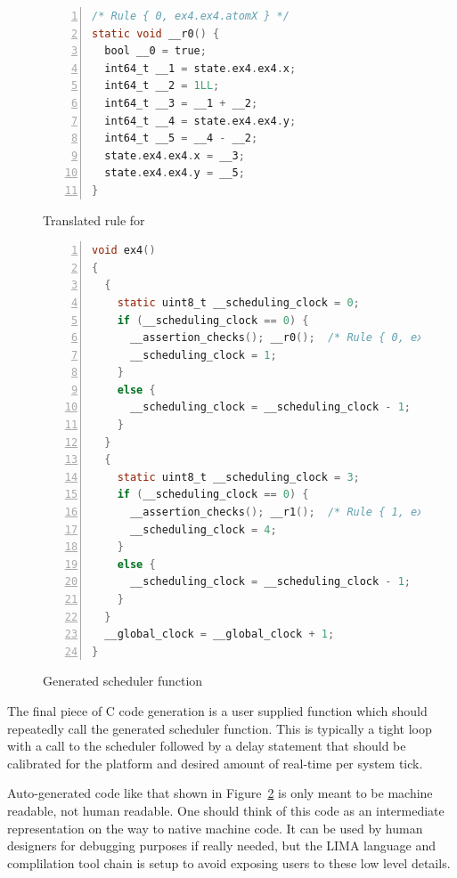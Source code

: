 \begin{figure}
    \begin{lstlisting}[language=C,
                       numbers=left,
                       numberstyle=\scriptsize,
                       stepnumber=1,
                       numbersep=8pt,
                       showstringspaces=false,
                       breaklines=true,
                       frame=single]
/* Rule { 0, ex4.ex4.atomX } */
static void __r0() {
  bool __0 = true;
  int64_t __1 = state.ex4.ex4.x;
  int64_t __2 = 1LL;
  int64_t __3 = __1 + __2;
  int64_t __4 = state.ex4.ex4.y;
  int64_t __5 = __4 - __2;
  state.ex4.ex4.x = __3;
  state.ex4.ex4.y = __5;
}
    \end{lstlisting}
    \caption{Translated rule for }
    \label{fig:code-gen-rule}
\end{figure}

\begin{figure}
    \begin{lstlisting}[language=C,
                       numbers=left,
                       numberstyle=\scriptsize,
                       stepnumber=1,
                       numbersep=8pt,
                       showstringspaces=false,
                       breaklines=true,
                       frame=single]
void ex4()
{
  {
    static uint8_t __scheduling_clock = 0;
    if (__scheduling_clock == 0) {
      __assertion_checks(); __r0();  /* Rule { 0, ex4.ex4.atomX } */
      __scheduling_clock = 1;
    }
    else {
      __scheduling_clock = __scheduling_clock - 1;
    }
  }
  {
    static uint8_t __scheduling_clock = 3;
    if (__scheduling_clock == 0) {
      __assertion_checks(); __r1();  /* Rule { 1, ex4.ex4.atomY } */
      __scheduling_clock = 4;
    }
    else {
      __scheduling_clock = __scheduling_clock - 1;
    }
  }
  __global_clock = __global_clock + 1;
}
    \end{lstlisting}
    \caption{Generated scheduler function}
    \label{fig:code-gen-scheduler}
\end{figure}

The final piece of C code generation is a user supplied  function
which should repeatedly call the generated scheduler function. This is
typically a tight loop with a call to the scheduler followed by a delay
statement that should be calibrated for the platform and desired amount of
real-time per system tick.

Auto-generated code like that shown in Figure~\ref{fig:code-gen-scheduler} is only
meant to be machine readable, not human readable. One should think of this code as
an intermediate representation on the way to native machine code. It can be used
by human designers for debugging purposes if really needed, but the LIMA language and
complilation tool chain is setup to avoid exposing users to these low level details.

